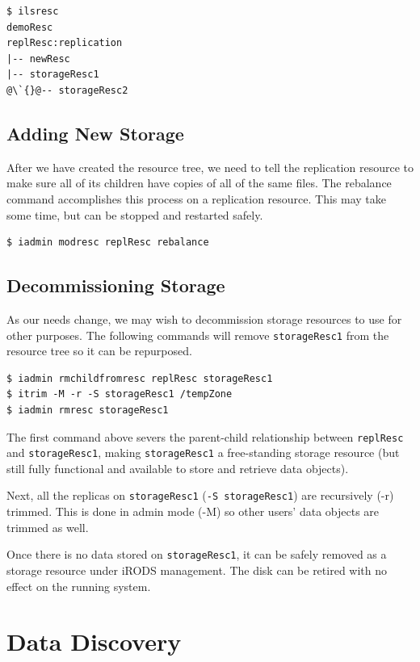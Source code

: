 \documentclass[10pt,oneside]{memoir}
\begin{document}
\begin{lstlisting}
$ ilsresc
demoResc
replResc:replication
|-- newResc
|-- storageResc1
@\`{}@-- storageResc2
\end{lstlisting}

\section{Adding New Storage}

After we have created the resource tree, we need to tell the replication resource to make sure all of its children have copies of all of the same files. The rebalance command accomplishes this process on a replication resource. This may take some time, but can be stopped and restarted safely.

\begin{lstlisting}
$ iadmin modresc replResc rebalance
\end{lstlisting}

\section{Decommissioning Storage}
As our needs change, we may wish to decommission storage resources to use for other purposes. The following commands will remove \texttt{storageResc1} from the resource tree so it can be repurposed.

\begin{lstlisting}
$ iadmin rmchildfromresc replResc storageResc1
$ itrim -M -r -S storageResc1 /tempZone
$ iadmin rmresc storageResc1
\end{lstlisting}

The first command above severs the parent-child relationship between \texttt{replResc} and \texttt{storageResc1}, making \texttt{storageResc1} a free-standing storage resource (but still fully functional and available to store and retrieve data objects).

Next, all the replicas on \texttt{storageResc1} (\texttt{-S storageResc1}) are recursively (-r) trimmed. This is done in admin mode (-M) so other users' data objects are trimmed as well.

Once there is no data stored on \texttt{storageResc1}, it can be safely removed as a storage resource under iRODS management. The disk can be retired with no effect on the running system.





\chapter{Data Discovery}
\end{document}
